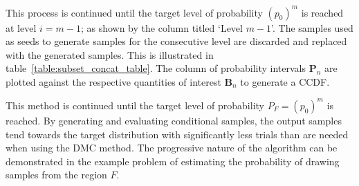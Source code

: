 \documentclass[journal]{IEEEtran}
\begin{document}
This process is continued until the target level of probability $(p_{0})^{m}$ is reached at level $i = m-1$; as shown by the column titled `Level $m-1$'. The samples used as seeds to generate samples for the consecutive level are discarded and replaced with the generated samples. This is illustrated in table~\ref{table:subset_concat_table}. The column of probability intervals $\textbf{P}_{n}$ are plotted against the respective quantities of interest $\textbf{B}_{n}$ to generate a CCDF.

This method is continued until the target level of probability $P_{F} = (p_{0})^{m}$ is reached. By generating and evaluating conditional samples, the output samples tend towards the target distribution with significantly less trials than are needed when using the DMC method. The progressive nature of the algorithm can be demonstrated in the example problem of estimating the probability of drawing samples from the region $F$.
\end{document}
